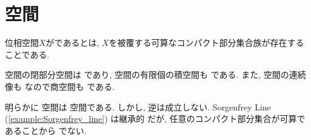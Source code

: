 \documentclass[uplatex, dvipdfmx, a4paper, 12pt, class=jsbook, crop=false]{standalone}
\begin{document}
\section{\sigmaCompact 空間}
\label{sec:sigma-compact-spaces}

\begin{definition}
	位相空間$ X $がであるとは, $ X $を被覆する可算なコンパクト部分集合族が存在することである.
\end{definition}

\sigmaCompact 空間の閉部分空間は \sigmaCompact であり, \sigmaCompact 空間の有限個の積空間も \sigmaCompact である. また,  \sigmaCompact 空間の連続像も \sigmaCompact なので商空間も \sigmaCompact である.

明らかに \sigmaCompact 空間は \Lindelof 空間である. しかし, 逆は成立しない. Sorgenfrey Line (\ref{example:Sorgenfrey_line}) は継承的 \Lindelof だが, 任意のコンパクト部分集合が可算であることから \sigmaCompact でない.
\end{document}
